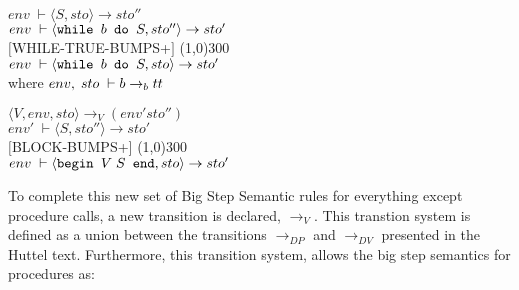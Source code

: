 

\begin{center}
    $env \; \vdash \langle S, sto \rangle \to sto''$ \\
    $env \; \vdash \langle \texttt{{while }} b \texttt{{ do }} S, sto'' \rangle \to sto'$ \\
    $[$WHILE-TRUE-BUMPS+$]$ \line(1,0){300} \\
    $env \; \vdash \langle \texttt{{while }} b \texttt{{ do }} S,sto \rangle \to sto'$ \\
    where $env, \; sto \; \vdash b \to_b tt$
\end{center}


\begin{center}
    $\langle V, env, sto \rangle \to_V (env' sto'')$ \\
    $env' \; \vdash \langle S, sto'' \rangle \to sto'$ \\
    $[$BLOCK-BUMPS+$]$ \line(1,0){300} \\
    $env \; \vdash \langle \texttt{{begin }} V \; S \texttt{{ end}},sto \rangle \to sto'$
\end{center}

\noindent\makebox[\linewidth]{\rule{\textwidth}{0.4pt}}

To complete this new set of Big Step Semantic rules for everything except procedure calls, a new transition is declared, $\to_V$. This transtion system is defined as a union between the transitions $\to_{DP}$ and $\to_{DV}$ presented in the Huttel text. Furthermore, this transition system, allows the big step semantics for procedures as:

\noindent\makebox[\linewidth]{\rule{\textwidth}{0.4pt}}



